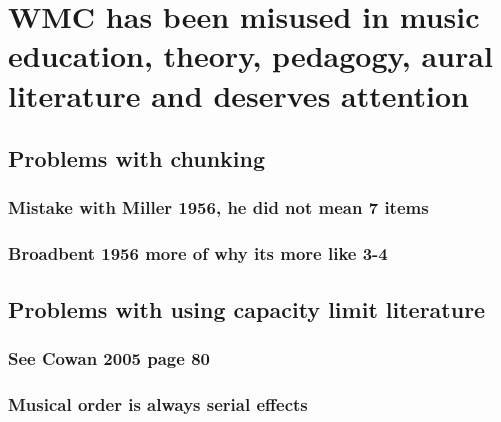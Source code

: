 \documentclass[]{book}
\theoremstyle{definition}
\theoremstyle{definition}
\theoremstyle{definition}
\theoremstyle{remark}
\begin{document}
\hypertarget{wmc-has-been-misused-in-music-education-theory-pedagogy-aural-literature-and-deserves-attention}{%
\section{WMC has been misused in music education, theory, pedagogy,
aural literature and deserves
attention}\label{wmc-has-been-misused-in-music-education-theory-pedagogy-aural-literature-and-deserves-attention}}

\hypertarget{problems-with-chunking}{%
\subsection{Problems with chunking}\label{problems-with-chunking}}

\hypertarget{mistake-with-miller-1956-he-did-not-mean-7-items}{%
\subsubsection{Mistake with Miller 1956, he did not mean 7
items}\label{mistake-with-miller-1956-he-did-not-mean-7-items}}

\hypertarget{broadbent-1956-more-of-why-its-more-like-3-4}{%
\subsubsection{Broadbent 1956 more of why its more like
3-4}\label{broadbent-1956-more-of-why-its-more-like-3-4}}

\hypertarget{problems-with-using-capacity-limit-literature}{%
\subsection{Problems with using capacity limit
literature}\label{problems-with-using-capacity-limit-literature}}

\hypertarget{see-cowan-2005-page-80}{%
\subsubsection{See Cowan 2005 page 80}\label{see-cowan-2005-page-80}}

\hypertarget{musical-order-is-always-serial-effects}{%
\subsubsection{Musical order is always serial
effects}\label{musical-order-is-always-serial-effects}}
\end{document}
